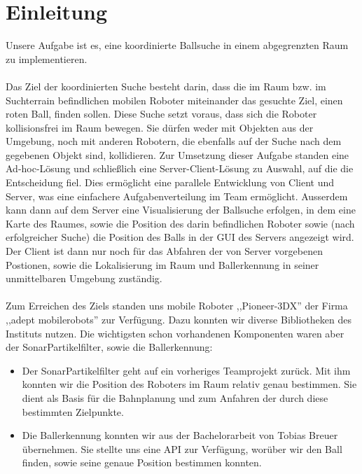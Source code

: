 
    \chapter{Einleitung}
    \label{einleitung}
    Unsere Aufgabe ist es, eine koordinierte Ballsuche in einem abgegrenzten Raum
    zu implementieren. \\\\

Das Ziel der koordinierten Suche besteht darin, dass die im Raum bzw. im
Suchterrain befindlichen mobilen Roboter miteinander das gesuchte Ziel, einen roten Ball,
finden sollen. Diese Suche setzt voraus, dass sich die Roboter kollisionsfrei
im Raum bewegen. Sie dürfen weder mit Objekten aus der Umgebung, noch
mit anderen Robotern, die ebenfalls auf der Suche nach dem gegebenen
Objekt sind, kollidieren. Zur Umsetzung dieser Aufgabe standen eine
Ad-hoc-Lösung und schließlich eine Server-Client-Lösung zu Auswahl, auf
die die Entscheidung fiel. Dies ermöglicht eine parallele Entwicklung
von Client und Server, was eine einfachere Aufgabenverteilung im Team
ermöglicht. Ausserdem kann dann auf dem Server eine Visualisierung der
Ballsuche erfolgen, in dem eine Karte des Raumes, sowie die Position des darin
befindlichen Roboter sowie (nach erfolgreicher Suche) die Position des Balls in der
GUI des Servers angezeigt wird. Der Client ist dann nur noch für das
Abfahren der von Server vorgebenen Postionen, sowie die Lokalisierung
im Raum und Ballerkennung in seiner unmittelbaren Umgebung
zuständig. \\\\
Zum Erreichen des Ziels standen uns mobile Roboter 
    ,,Pioneer-3DX'' der Firma ,,adept mobilerobots'' zur
    Verfügung. Dazu konnten wir diverse Bibliotheken des Instituts
    nutzen. Die wichtigsten schon vorhandenen Komponenten waren aber
    der SonarPartikelfilter, sowie die Ballerkennung:
    \begin{itemize}
    \item Der SonarPartikelfilter geht auf ein vorheriges Teamprojekt
      zurück. Mit ihm konnten wir die Position des Roboters im Raum
      relativ  genau bestimmen. Sie dient als Basis für die Bahnplanung
      und zum Anfahren der durch diese bestimmten Zielpunkte.
    \item Die Ballerkennung konnten wir aus der Bachelorarbeit von
      Tobias Breuer übernehmen. Sie stellte uns eine API zur Verfügung,
      worüber wir den Ball finden, sowie seine genaue Position
      bestimmen konnten.
    \end{itemize}
